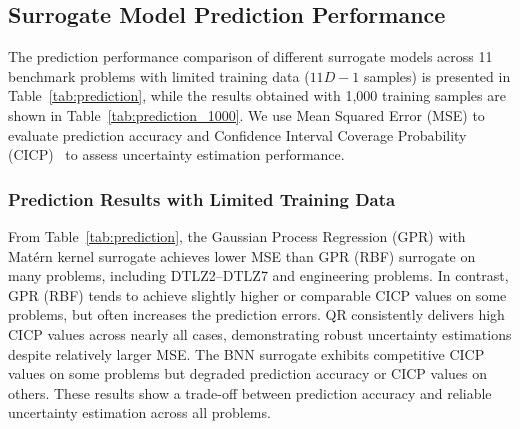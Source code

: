 \documentclass{article}
\begin{document}
\subsection{Surrogate Model Prediction Performance}
The prediction performance comparison of different surrogate models across 11 benchmark problems with limited training data ($11D-1$ samples) is presented in Table~\ref{tab:prediction}, while the results obtained with 1,000 training samples are shown in Table~\ref{tab:prediction_1000}. We use Mean Squared Error (MSE) to evaluate prediction accuracy and Confidence Interval Coverage Probability (CICP)~\cite{cicp} to assess uncertainty estimation performance.

\subsubsection{Prediction Results with Limited Training Data}
From Table~\ref{tab:prediction}, the Gaussian Process Regression (GPR) with Mat\'ern kernel surrogate \cite{kernel_Matern_52} achieves lower MSE than GPR (RBF) surrogate \cite{gaussian_kernel} on many problems, including DTLZ2–DTLZ7 and engineering problems. In contrast, GPR (RBF) tends to achieve slightly higher or comparable CICP values on some problems, but often increases the prediction errors. QR \cite{ml_autogluon} consistently delivers high CICP values across nearly all cases, demonstrating robust uncertainty estimations despite relatively larger MSE. The BNN \cite{bnn} surrogate exhibits competitive CICP values on some problems but degraded prediction accuracy or CICP values on others. These results show a trade-off between prediction accuracy and reliable uncertainty estimation across all problems.
\end{document}
